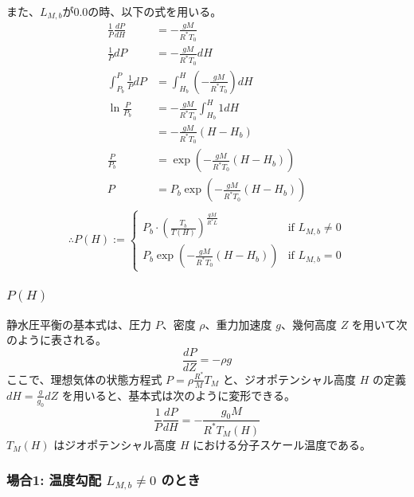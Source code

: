 \documentclass[a4paper,12pt]{article}
\begin{document}
また、$L_{M, b}$が0.0の時、以下の式を用いる。
\begin{align*}
\frac{1}{P}\frac{dP}{dH}&=-\frac{gM}{R^*T_0}\\
\frac{1}{P}dP&=-\frac{gM}{R^*T_0}dH\\
\int_{P_b}^{P}\frac{1}{P}dP&=\int_{H_b}^{H}\left(-\frac{gM}{R^*T_0}\right)dH\\
\ln\frac{P}{P_b}&=-\frac{gM}{R^*T_0}\int_{H_b}^{H}1dH\\
&=-\frac{gM}{R^*T_0}(H-H_b)\\
\frac{P}{P_b}&=\exp (-\frac{gM}{R^*T_0}(H-H_b))\\
P &= P_b \exp (-\frac{gM}{R^*T_0}(H-H_b))\\
\end{align*}
\[
\therefore
P(H) :=
\left\{
  \begin{array}{ll}
    P_b \cdot \left( \frac{T_b}{T(H)} \right) ^ {\frac{gM}{R^*L}} & \text{if } L_{M,b} \not = 0\\
    P_b \exp (-\frac{gM}{R^*T_0}(H-H_b)) & \text{if } L_{M,b} = 0 
  \end{array}
\right.
\]

\subsubsection{$P(H)$}

静水圧平衡の基本式は、圧力 $P$、密度 $\rho$、重力加速度 $g$、幾何高度 $Z$ を用いて次のように表される。
\[
\frac{dP}{dZ} = - \rho g
\]
ここで、理想気体の状態方程式 $P = \rho \frac{R^*}{M} T_M$ と、ジオポテンシャル高度 $H$ の定義 $dH = \frac{g}{g_0} dZ$ を用いると、基本式は次のように変形できる。
\[
\frac{1}{P}\frac{dP}{dH} = -\frac{g_0 M}{R^*T_M(H)}
\]
$T_M(H)$ はジオポテンシャル高度 $H$ における分子スケール温度である。

\subsubsection*{場合1: 温度勾配 $L_{M,b} \neq 0$ のとき}
\end{document}
